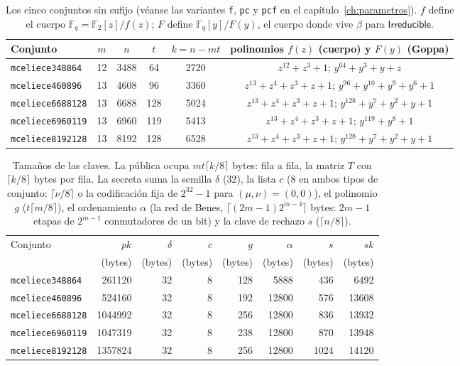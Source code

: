 \documentclass[11pt,a4paper,oneside]{report}
\newcommand{\F}{\mathbb{F}}
\newcommand{\GF}[1]{\mathbb{F}_{#1}}
\newcommand{\Ftwo}{\F_2}
\begin{document}
\begin{table}[htbp]
\centering
\small
\begin{tabular}{lccccc}
\toprule
Conjunto & $m$ & $n$ & $t$ & $k=n-mt$ & polinomios $f(z)$ (cuerpo) y $F(y)$ (Goppa)\\
\midrule
\texttt{mceliece348864} & 12 & 3488 & 64 & 2720
  & $z^{12}\!+\!z^3\!+\!1$; \quad $y^{64}\!+\!y^3\!+\!y\!+\!z$\\
\texttt{mceliece460896} & 13 & 4608 & 96 & 3360
  & $z^{13}\!+\!z^4\!+\!z^3\!+\!z\!+\!1$; \quad $y^{96}\!+\!y^{10}\!+\!y^9\!+\!y^6\!+\!1$\\
\texttt{mceliece6688128} & 13 & 6688 & 128 & 5024
  & $z^{13}\!+\!z^4\!+\!z^3\!+\!z\!+\!1$; \quad $y^{128}\!+\!y^7\!+\!y^2\!+\!y\!+\!1$\\
\texttt{mceliece6960119} & 13 & 6960 & 119 & 5413
  & $z^{13}\!+\!z^4\!+\!z^3\!+\!z\!+\!1$; \quad $y^{119}\!+\!y^8\!+\!1$\\
\texttt{mceliece8192128} & 13 & 8192 & 128 & 6528
  & $z^{13}\!+\!z^4\!+\!z^3\!+\!z\!+\!1$; \quad $y^{128}\!+\!y^7\!+\!y^2\!+\!y\!+\!1$\\
\bottomrule
\end{tabular}
\caption{Los cinco conjuntos sin sufijo (véanse las variantes
\texttt{f}, \texttt{pc} y \texttt{pcf} en el
capítulo~\ref{ch:parametros}). $f$ define el cuerpo
$\GF q=\Ftwo[z]/f(z)$; $F$ define $\GF q[y]/F(y)$, el cuerpo donde
vive $\beta$ para $\textsf{Irreducible}$.}
\label{tab:keygen-pol}
\end{table}

\begin{table}[htbp]
\centering
\small
\setlength{\tabcolsep}{6pt}
\begin{tabular}{lrrrrrrr}
\toprule
Conjunto & $pk$ & $\delta$ & $c$ & $g$ & $\alpha$ & $s$ & $sk$\\
 & (bytes) & (bytes) & (bytes) & (bytes) & (bytes) & (bytes) & (bytes)\\
\midrule
\texttt{mceliece348864} & \num{261120} & 32 & 8 & 128 & 5888 & 436 & \num{6492}\\
\texttt{mceliece460896} & \num{524160} & 32 & 8 & 192 & 12800 & 576 & \num{13608}\\
\texttt{mceliece6688128} & \num{1044992} & 32 & 8 & 256 & 12800 & 836 & \num{13932}\\
\texttt{mceliece6960119} & \num{1047319} & 32 & 8 & 238 & 12800 & 870 & \num{13948}\\
\texttt{mceliece8192128} & \num{1357824} & 32 & 8 & 256 & 12800 & 1024 & \num{14120}\\
\bottomrule
\end{tabular}
\caption{Tamaños de las claves. La pública ocupa $mt\lceil k/8\rceil$
bytes: fila a fila, la matriz $T$ con $\lceil k/8\rceil$ bytes por fila.
La secreta suma la semilla $\delta$ ($32$), la lista $c$ ($8$ en ambos
tipos de conjunto: $\lceil\nu/8\rceil$ o la codificación fija de
$2^{32}-1$ para $(\mu,\nu)=(0,0)$), el polinomio $g$
($t\lceil m/8\rceil$), el ordenamiento $\alpha$ (la red de Benes,
$\lceil(2m-1)2^{m-4}\rceil$ bytes: $2m-1$ etapas de $2^{m-1}$
conmutadores de un bit) y la clave de rechazo $s$ ($\lceil n/8\rceil$).}
\label{tab:keygen-tamanos}
\end{table}
\end{document}

